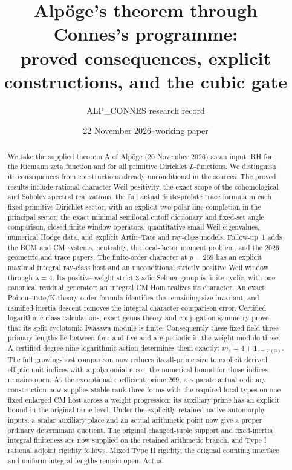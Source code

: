 \documentclass[11pt,a4paper]{article}
\title{Alp\"oge's theorem through Connes's programme:\\
proved consequences, explicit constructions, and the cubic gate}
\author{ALP\_CONNES research record}
\date{22 November 2026\quad--\quad working paper}
\theoremstyle{definition}
\theoremstyle{remark}
\begin{document}
\maketitle
\begin{abstract}
We take the supplied theorem A of Alp\"oge (20 November 2026) as an
input: RH for the Riemann zeta function and for all primitive
Dirichlet $L$-functions. We distinguish its consequences from
constructions already unconditional in the sources. The proved
results include rational-character Weil positivity, the exact
scope of the cohomological and Sobolev spectral realizations,
the full actual finite-prolate trace formula in each fixed
primitive Dirichlet sector, with an explicit two-polar-line
completion in the principal sector, the exact minimal semilocal
cutoff dictionary and fixed-set angle comparison, closed finite-window
operators, quantitative small Weil
eigenvalues, numerical Hodge data, and explicit Artin--Tate and
ray-class models. Follow-up~1 adds the BCM and CM systems,
neutrality, the local-factor moment problem, and the 2026
geometric and trace papers. The finite-order character at
$p=269$ has an explicit maximal integral ray-class host and
an unconditional strictly positive Weil window through
$\lambda=4$. Its positive-weight strict $3$-adic Selmer
group is finite cyclic, with one canonical residual generator;
an integral CM Hom realizes its character. An exact
Poitou--Tate/K-theory order formula identifies the remaining
size invariant, and ramified-inertia descent removes the
integral character-comparison error. Certified logarithmic
class calculations, exact genus theory and conjugation symmetry
prove that its split cyclotomic Iwasawa module is finite.
Consequently these fixed-field three-primary lengths lie
between four and five and are periodic in the weight modulo three.
A certified degree-nine logarithmic action determines them exactly:
$m_e=4+\mathbf1_{e\equiv2\ (3)}$.
The full growing-host comparison now reduces its all-prime size
to explicit derived elliptic-unit indices with a polynomial error;
the numerical bound for those indices remains open.
At the exceptional coefficient prime $269$, a separate actual
ordinary construction now supplies stable rank-three forms with
the required local types on one fixed enlarged CM host across a
weight progression; its auxiliary prime has an explicit bound
in the original tame level.  Under the explicitly retained native
automorphy inputs, a scalar auxiliary place and an actual arithmetic
point now give a proper ordinary determinant quotient.  The original
changed-tuple support and fixed-inertia integral finiteness are now supplied on the retained arithmetic branch, and Type I rational adjoint rigidity follows. Mixed Type II rigidity, the original counting interface and uniform integral lengths remain open.  Actual

\end{abstract}
\end{document}
